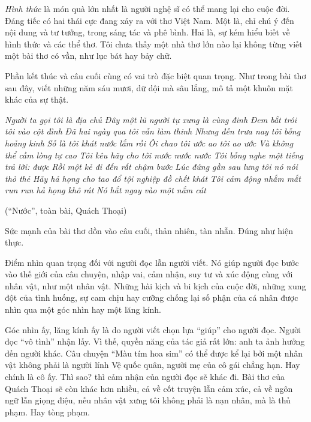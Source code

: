 \documentclass[../main.tex]{subfiles}
\begin{document}
\begin{multicols}{2}
\textit{Hình thức} là món quà lớn nhất là người nghệ sĩ có thể mang lại cho cuộc đời. Đáng tiếc có hai thái cực đang xảy ra với thơ Việt Nam. Một là, chỉ chú ý đến nội dung và tư tưởng, trong sáng tác và phê bình. Hai là, sự kém hiểu biết về hình thức và các thể thơ. Tôi chưa thấy một nhà thơ lớn nào lại không từng viết một bài thơ có vần, như lục bát hay bảy chữ. 
 
Phần kết thúc và câu cuối cùng có vai trò đặc biệt quan trọng. Như trong bài thơ sau đây, viết những năm sáu mươi, dữ dội mà sâu lắng, mô tả một khuôn mặt khác của sự thật.  
\begin{blockquote}
        
\textit{Người ta gọi tôi là địa chủ}        
\textit{Đây một lũ người tự xưng là cùng đinh}        
\textit{Đem bắt trói tôi vào cột đình}        
\textit{Đã hai ngày qua tôi vẫn làm thinh}        
\textit{Nhưng đến trưa nay tôi bỗng hoảng kinh}        
\textit{Số là tôi khát nước lắm rồi}        
\textit{Ôi chao tôi ước ao tôi ao ước}        
\textit{Và không thể cầm lòng tự cao}        
\textit{Tôi kêu hãy cho tôi nước nước nước}        
\textit{Tôi bỗng nghe một tiếng trả lời: được}        
\textit{Rồi một kẻ đi đến rất chậm bước}        
\textit{Lúc đứng gần sau lưng tôi nó nói thỏ thẻ}        
\textit{Hãy hả họng cho tao đổ tội nghiệp đồ chết khát}        
\textit{Tôi cảm động nhắm mắt run run hả họng khô rát} 
\textit{Nó hắt ngay vào một nắm cát} 
        
(“Nước”, toàn bài, Quách Thoại)  

\end{blockquote}
 
Sức mạnh của bài thơ dồn vào câu cuối, thản nhiên, tàn nhẫn. Đúng như hiện thực.  
 
Điểm nhìn quan trọng đối với người đọc lẫn người viết. Nó giúp người đọc bước vào thế giới của câu chuyện, nhập vai, cảm nhận, suy tư và xúc động cùng với nhân vật, như một nhân vật. Những hài kịch và bi kịch của cuộc đời, những xung đột của tình huống, sự cam chịu hay cưỡng chống lại số phận của cá nhân được nhìn qua một góc nhìn hay một lăng kính. 
 
Góc nhìn ấy, lăng kính ấy là do người viết chọn lựa “giúp” cho người đọc. Người đọc “vô tình” nhận lấy. Vì thế, quyền năng của tác giả rất lớn: anh ta ảnh hưởng đến người khác. Câu chuyện “Màu tím hoa sim” có thể được kể lại bởi một nhân vật không phải là người lính Vệ quốc quân, người mẹ của cô gái chẳng hạn. Hay chính là cô ấy. Thì sao? thì cảm nhận của người đọc sẽ khác đi. Bài thơ của Quách Thoại sẽ còn khác hơn nhiều, cả về cốt truyện lẫn cảm xúc, cả về ngôn ngữ lẫn giọng điệu, nếu nhân vật xưng tôi không phải là nạn nhân, mà là thủ phạm. Hay tòng phạm. 
 

\end{multicols}
\end{document}

